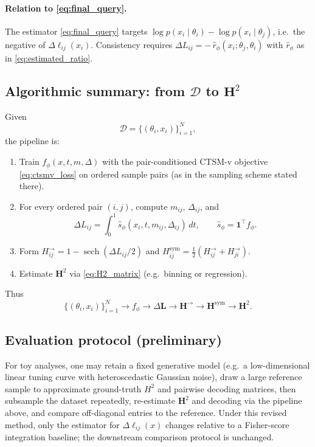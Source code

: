 \paragraph{Relation to \eqref{eq:final_query}.}
The estimator \eqref{eq:final_query} targets $\log p(x_i\mid \theta_i)-\log p(x_i\mid \theta_j)$, i.e.\ the negative of $\Delta \ell_{ij}(x_i)$. Consistency requires $\Delta L_{ij}=-\,\hat r_\phi(x_i;\theta_j,\theta_i)$ with $\hat r_\phi$ as in \eqref{eq:estimated_ratio}.

\subsection{Algorithmic summary: from \texorpdfstring{$\mathcal{D}$}{D} to \texorpdfstring{$\mathbf{H}^2$}{H squared}}

Given
\begin{equation}
    \mathcal{D}=\{(\theta_i,x_i)\}_{i=1}^N,
\end{equation}
the pipeline is:
\begin{enumerate}[leftmargin=2em]
    \item Train $f_\phi(x,t,m,\Delta)$ with the pair-conditioned CTSM-v objective \eqref{eq:ctsmv_loss} on ordered sample pairs (as in the sampling scheme stated there).
    \item For every ordered pair $(i,j)$, compute $m_{ij}$, $\Delta_{ij}$, and
    \begin{equation*}
        \Delta L_{ij}=\int_0^1 \hat s_\phi(x_i,t,m_{ij},\Delta_{ij})\,dt,
        \qquad
        \hat s_\phi=\mathbf{1}^\top f_\phi.
    \end{equation*}
    \item Form $H^{\rightarrow}_{ij}=1-\operatorname{sech}(\Delta L_{ij}/2)$ and $H^{\mathrm{sym}}_{ij}=\tfrac12(H^{\rightarrow}_{ij}+H^{\rightarrow}_{ji})$.
    \item Estimate $\mathbf{H}^2$ via \eqref{eq:H2_matrix} (e.g.\ binning or regression).
\end{enumerate}
Thus
\begin{equation*}
    \{(\theta_i,x_i)\}_{i=1}^N
    \longrightarrow
    f_\phi
    \longrightarrow
    \Delta \mathbf{L}
    \longrightarrow
    \mathbf{H}^{\rightarrow}
    \longrightarrow
    \mathbf{H}^{\mathrm{sym}}
    \longrightarrow
    \mathbf{H}^2.
\end{equation*}

\subsection{Evaluation protocol (preliminary)}

For toy analyses, one may retain a fixed generative model (e.g.\ a low-dimensional linear tuning curve with heteroscedastic Gaussian noise), draw a large reference sample to approximate ground-truth $H^2$ and pairwise decoding matrices, then subsample the dataset repeatedly, re-estimate $\mathbf{H}^2$ and decoding via the pipeline above, and compare off-diagonal entries to the reference. Under this revised method, only the estimator for $\Delta \ell_{ij}(x)$ changes relative to a Fisher-score integration baseline; the downstream comparison protocol is unchanged.
